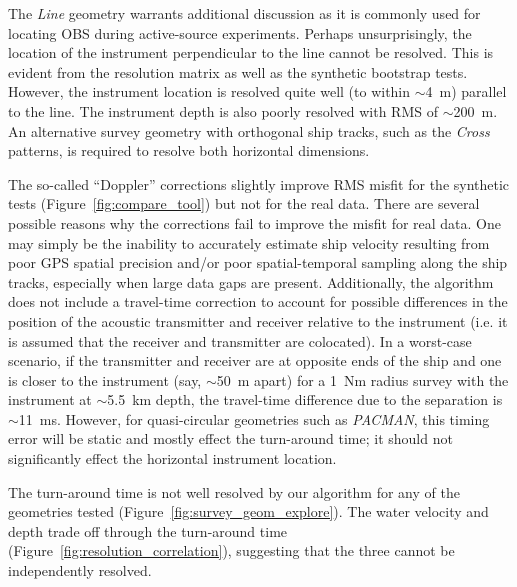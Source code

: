 The \textit{Line} geometry warrants additional discussion as it is commonly used for locating OBS during active-source experiments. Perhaps unsurprisingly, the location of the instrument perpendicular to the line cannot be resolved. This is evident from the resolution matrix as well as the synthetic bootstrap tests. However, the instrument location is resolved quite well (to within $\sim$4~m) parallel to the line. The instrument depth is also poorly resolved with RMS of $\sim$200~m. An alternative survey geometry with orthogonal ship tracks, such as the \textit{Cross} patterns, is required to resolve both horizontal dimensions.

The so-called ``Doppler'' corrections slightly improve RMS misfit for the synthetic tests (Figure~\ref{fig:compare_tool}) but not for the real data. There are several possible reasons why the corrections fail to improve the misfit for real data. One may simply be the inability to accurately estimate ship velocity resulting from poor GPS spatial precision and/or poor spatial-temporal sampling along the ship tracks, especially when large data gaps are present. Additionally, the algorithm does not include a travel-time correction to account for possible differences in the position of the acoustic transmitter and receiver relative to the instrument (i.e. it is assumed that the receiver and transmitter are colocated). In a worst-case scenario, if the transmitter and receiver are at opposite ends of the ship and one is closer to the instrument (say, $\sim$50~m apart) for a 1~Nm radius survey with the instrument at $\sim$5.5~km depth, the travel-time difference due to the separation is $\sim$11~ms. However, for quasi-circular geometries such as \textit{PACMAN}, this timing error will be static and mostly effect the turn-around time; it should not significantly effect the horizontal instrument location.

The turn-around time is not well resolved by our algorithm for any of the geometries tested (Figure~\ref{fig:survey_geom_explore}). The water velocity and depth trade off through the turn-around time (Figure~\ref{fig:resolution_correlation}), suggesting that the three cannot be independently resolved.